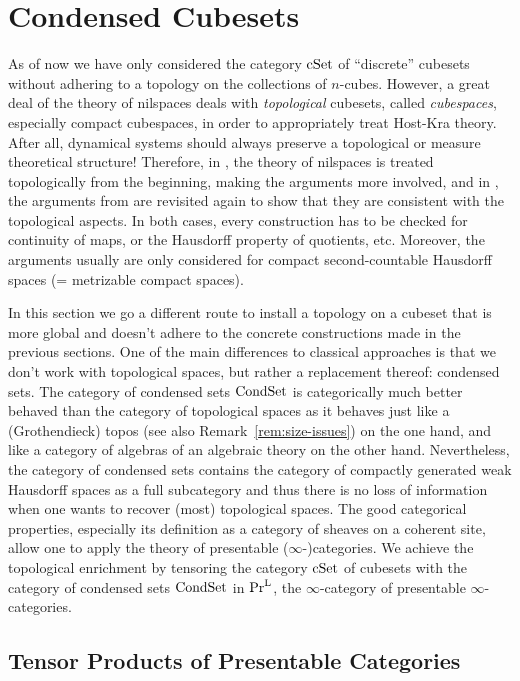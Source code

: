 
\section{Condensed Cubesets}\label{sec:condensed-cubeset}

As of now we have only considered the category $\mathrm{cSet}$ of \enquote{discrete} cubesets without adhering to a topology
on the collections of $n$-cubes.
However, a great deal of the theory of nilspaces deals with \emph{topological} cubesets,
called \emph{cubespaces}, especially compact cubespaces, in order to appropriately treat Host-Kra theory.
After all, dynamical systems should always preserve a topological or measure theoretical structure!
Therefore, in \cite{Gutman2020}, the theory of nilspaces is treated topologically from the beginning,  making the arguments more involved,
and in \cite{Candela2017a}, the arguments from \cite{Candela2017} are revisited again to show that they are consistent with the topological aspects.
In both cases, every construction has to be checked for continuity of maps,
or the Hausdorff property of quotients, etc.
Moreover, the arguments usually are only considered for compact second-countable Hausdorff spaces (= metrizable compact spaces).

In this section we go a different route to install a topology on a cubeset
that is more global and doesn't adhere to the concrete constructions made in the previous sections.
One of the main differences to classical approaches is that we don't work with topological spaces,
but rather a replacement thereof: condensed sets.
The category of condensed sets $\mathrm{CondSet}$ is categorically much better behaved
than the category of topological spaces as it behaves just like a (Grothendieck) topos
(see also Remark~\ref{rem:size-issues}) on the one hand,
and like a category of algebras of an algebraic theory on the other hand.
Nevertheless, the category of condensed sets contains the category of compactly generated weak Hausdorff spaces as a full subcategory
and thus there is no loss of information when one wants to recover (most) topological spaces.
The good categorical properties, especially its definition as a category of sheaves on a coherent site,
allow one to apply the theory of presentable ($\infty$-)categories.
We achieve the topological enrichment by tensoring the category $\mathrm{cSet}$ of cubesets
with the category of condensed sets $\mathrm{CondSet}$ in $\mathrm{Pr}^\mathrm{L}$, the $\infty$-category of presentable $\infty$-categories.


\subsection{Tensor Products of Presentable Categories}

